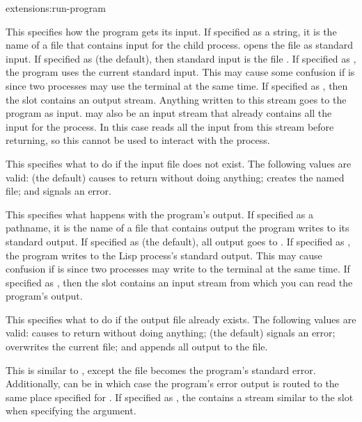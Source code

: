 \begin{defun}{extensions:}{run-program}
\begin{Lentry}
  \item[\kwd{input}] This specifies how the program gets its input.
    If specified as a string, it is the name of a file that contains
    input for the child process.   opens the file as
    standard input.  If specified as \nil{} (the default), then
    standard input is the file .  If specified as
    \true, the program uses the current standard input.  This may
    cause some confusion if  is \nil{} since two processes
    may use the terminal at the same time.  If specified as
    , then the  slot contains an
    output stream.  Anything written to this stream goes to the
    program as input.   may also be an input stream that
    already contains all the input for the process.  In this case
     reads all the input from this stream before
    returning, so this cannot be used to interact with the process.
    
  \item[\kwd{if-input-does-not-exist}] This specifies what to do if
    the input file does not exist.  The following values are valid:
    \nil{} (the default) causes  to return \nil{}
    without doing anything;  creates the named file; and
     signals an error.
    
  \item[\kwd{output}] This specifies what happens with the program's
    output.  If specified as a pathname, it is the name of a file that
    contains output the program writes to its standard output.  If
    specified as \nil{} (the default), all output goes to
    .  If specified as \true, the program writes to
    the Lisp process's standard output.  This may cause confusion if
     is \nil{} since two processes may write to the terminal
    at the same time.  If specified as , then the
     slot contains an input stream from which you
    can read the program's output.
    
  \item[\kwd{if-output-exists}] This specifies what to do if the
    output file already exists.  The following values are valid:
    \nil{} causes  to return \nil{} without doing
    anything;  (the default) signals an error;
     overwrites the current file; and 
    appends all output to the file.
    
  \item[\kwd{error}] This is similar to , except the file
    becomes the program's standard error.  Additionally, 
    can be  in which case the program's error output is
    routed to the same place specified for .  If specified
    as , the  contains a stream
    similar to the  slot when specifying the
     argument.
    

\end{Lentry}
\end{defun}
